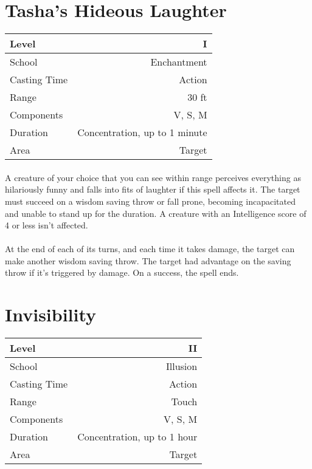 \documentclass[a5paper,12pt]{article}
\begin{document}
\section*{Tasha's Hideous Laughter}
\begin{table}[h]
   \centering
   \begin{tabular}{|l|r|}
      \hline
      Level        & I \\
      \hline
      School       & Enchantment \\
      \hline
      Casting Time & Action \\
      \hline
      Range        & 30 ft \\
      \hline
      Components   & V, S, M \\
      \hline
      Duration     & Concentration, up to 1 minute \\
      \hline
      Area         & Target \\
      \hline
   \end{tabular}
\end{table}

\paragraph{}
A creature of your choice that you can see within range perceives everything as hilariously funny and falls into fits of laughter if this spell affects it. The target must succeed on a wisdom saving throw or fall prone, becoming incapacitated and unable to stand up for the duration. A creature with an Intelligence score of 4 or less isn’t affected.

\paragraph{}
At the end of each of its turns, and each time it takes damage, the target can make another wisdom saving throw. The target had advantage on the saving throw if it’s triggered by damage. On a success, the spell ends.

\newpage

\section*{Invisibility}
\begin{table}[h]
   \centering
   \begin{tabular}{|l|r|}
      \hline
      Level        & II \\
      \hline
      School       & Illusion \\
      \hline
      Casting Time & Action \\
      \hline
      Range        & Touch \\
      \hline
      Components   & V, S, M \\
      \hline
      Duration     & Concentration, up to 1 hour \\
      \hline
      Area         & Target \\
      \hline
   \end{tabular}
\end{table}
\end{document}
